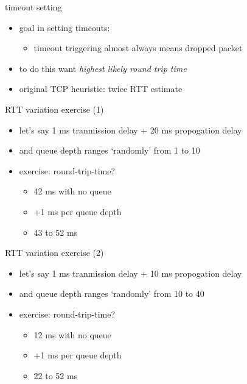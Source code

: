 \begin{frame}{timeout setting}
    \begin{itemize}
    \item goal in setting timeouts:
        \begin{itemize}
        \item timeout triggering almost always means dropped packet
        \end{itemize}
    \item to do this want \textit{highest likely round trip time}
    \vspace{.5cm}
    \item original TCP heuristic: twice RTT estimate
    \end{itemize}
\end{frame}

\begin{frame}{RTT variation exercise (1)}
    \begin{itemize}
    \item let's say 1 ms tranmission delay + 20 ms propogation delay
    \item and queue depth ranges `randomly' from 1 to 10
    \item exercise: round-trip-time?
        \begin{itemize}
        \item<2-> 42 ms with no queue
        \item<2-> +1 ms per queue depth
        \item<2-> 43 to 52 ms
        \end{itemize}
    \end{itemize}
\end{frame}

\begin{frame}{RTT variation exercise (2)}
    \begin{itemize}
    \item let's say 1 ms tranmission delay + 10 ms propogation delay
    \item and queue depth ranges `randomly' from 10 to 40
    \item exercise: round-trip-time?
        \begin{itemize}
        \item<2-> 12 ms with no queue
        \item<2-> +1 ms per queue depth
        \item<2-> 22 to 52 ms
        \end{itemize}
    \end{itemize}
\end{frame}

